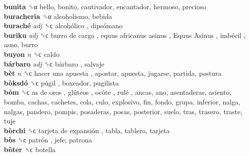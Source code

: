 \textbf{bunita} ␝α  bello, bonito, cautivador, encantador, hermoso, precioso  \\
\textbf{buracheria} ␝α  alcoholismo, bebida  \\
\textbf{buraché} \emph{adj}  ␝ϲ   alcohólico ,  dipsómano   \\
\textbf{buriku} \emph{adj}  ␝ϲ   burro de carga ,  equus africanus asinus ,  Equus Asinus ,  imbécil , asno, burro  \\
\textbf{buyon} \emph{n}  ␝ϲ  caldo  \\
\textbf{bárbaro} \emph{adj}  ␝ϲ   bárbaro , salvaje  \\
\textbf{bèt} \emph{n}  ␝ϲ   hacer una apuesta , apostar, apuesta, jugarse, partida, postura  \\
\textbf{bòksdó} ␝ϲ   púgil , boxeador, pugilista  \\
\textbf{bòm} ␝ϲ   as de oros ,  glúteos ,  ocóte ,  rulé , ancas, ano, asentaderas, asiento, bomba, cachas, cachetes, cola, culo, explosivo, fin, fondo, grupa, inferior, nalga, nalgas, pandero, pompis, posaderas, posas, posterior, suelo, tras, trasero, traste, tuje  \\
\textbf{bòrchi} ␝ϲ   tarjeta de expansión , tabla, tablero, tarjeta  \\
\textbf{bòs} ␝ϲ   patrón , jefe, patrona  \\
\textbf{bòter} ␝ϲ  botella  \\
